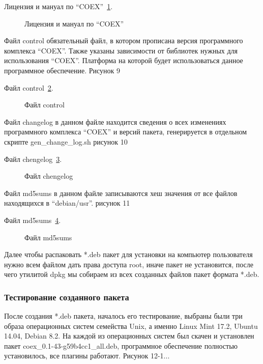 Лицензия и мануал по ``COEX''~\ref{LIcenzMan:LIcenzMan}.

\begin{figure}[h!]
\caption{ Лицензия и мануал по ``COEX'' }
\label{LIcenzMan:LIcenzMan}
\end{figure}

Файл control обязательный файл, в котором прописана версия программного комплекса ``COEX''. Также указаны зависимости от библиотек нужных для использования ``COEX''. Платформа на которой будет использоваться данное программное обеспечение. Рисунок 9

Файл control~\ref{control:control}.

\begin{figure}[h!]
\caption{ Файл control }
\label{control:control}
\end{figure}

Файл changelog в данном файле находится сведения о всех изменениях программного комплекса ``COEX'' и версий пакета, генерируется в отдельном скрипте gen\_change\_log.sh рисунок 10

Файл chengelog~\ref{chengelog:chengelog}.

\begin{figure}[h!]
\caption{ Файл chengelog }
\label{chengelog:chengelog}
\end{figure}

Файл md5sums в данном файле записываются хеш значения от все файлов находящихся в ``debian/usr''. рисунок 11

Файл md5sums~\ref{md5sums:md5sums}.

\begin{figure}[h!]
\caption{ Файл md5sums }
\label{md5sums:md5sums}
\end{figure}

Далее чтобы распаковать *.deb пакет для установки на компьютер пользователя нужно всем файлом дать права доступа root, иначе пакет не установится, после чего утилитой dpkg мы собираем из всех созданных файлов пакет формата *.deb. 

\subsubsection{Тестирование созданного пакета}

После создания *.deb пакета, началось его тестирование, выбраны были три образа операционных систем семейства Unix, а именно Linux Mint 17.2, Ubuntu 14.04, Debian 8.2. На каждой из операционных систем был скачен и установлен пакет coex\_0.1-43-g59b4cc1\_all.deb, программное обеспечение полностью установилось, все плагины работают. Рисунок 12-1...

